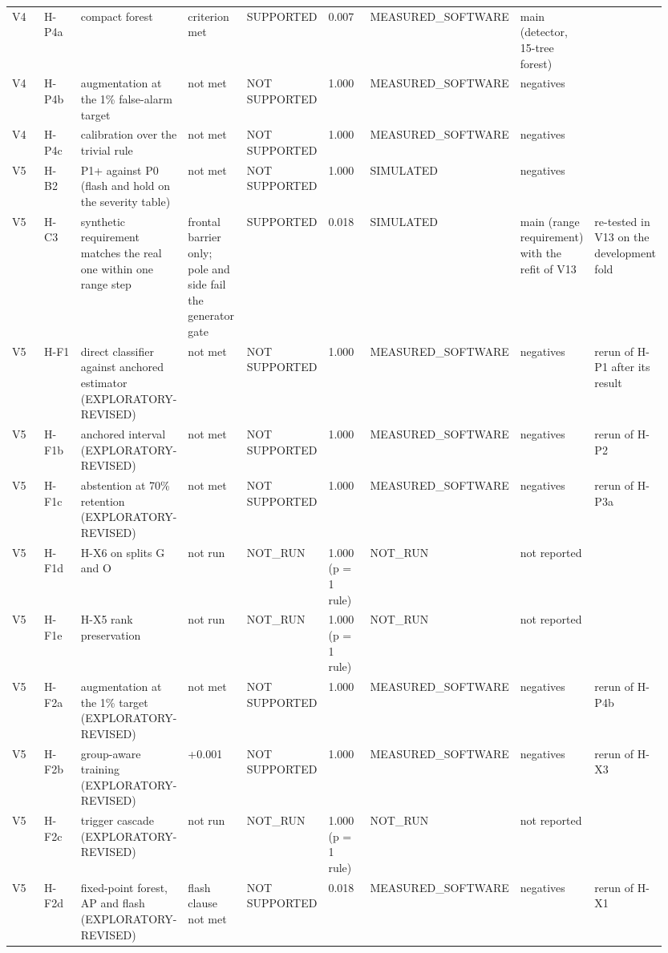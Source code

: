 {\begin{longtable}{p{0.106\linewidth}p{0.106\linewidth}p{0.106\linewidth}p{0.106\linewidth}p{0.106\linewidth}p{0.106\linewidth}p{0.106\linewidth}p{0.106\linewidth}p{0.106\linewidth}}
V4 & H-P4a & compact forest & criterion met & SUPPORTED & 0.007 & MEASURED\_SOFTWARE & main (detector, 15-tree forest) &  \\
V4 & H-P4b & augmentation at the 1\% false-alarm target & not met & NOT SUPPORTED & 1.000 & MEASURED\_SOFTWARE & negatives &  \\
V4 & H-P4c & calibration over the trivial rule & not met & NOT SUPPORTED & 1.000 & MEASURED\_SOFTWARE & negatives &  \\
V5 & H-B2 & P1+ against P0 (flash and hold on the severity table) & not met & NOT SUPPORTED & 1.000 & SIMULATED & negatives &  \\
V5 & H-C3 & synthetic requirement matches the real one within one range step & frontal barrier only; pole and side fail the generator gate & SUPPORTED & 0.018 & SIMULATED & main (range requirement) with the refit of V13 & re-tested in V13 on the development fold \\
V5 & H-F1 & direct classifier against anchored estimator (EXPLORATORY-REVISED) & not met & NOT SUPPORTED & 1.000 & MEASURED\_SOFTWARE & negatives & rerun of H-P1 after its result \\
V5 & H-F1b & anchored interval (EXPLORATORY-REVISED) & not met & NOT SUPPORTED & 1.000 & MEASURED\_SOFTWARE & negatives & rerun of H-P2 \\
V5 & H-F1c & abstention at 70\% retention (EXPLORATORY-REVISED) & not met & NOT SUPPORTED & 1.000 & MEASURED\_SOFTWARE & negatives & rerun of H-P3a \\
V5 & H-F1d & H-X6 on splits G and O & not run & NOT\_RUN & 1.000 (p = 1 rule) & NOT\_RUN & not reported &  \\
V5 & H-F1e & H-X5 rank preservation & not run & NOT\_RUN & 1.000 (p = 1 rule) & NOT\_RUN & not reported &  \\
V5 & H-F2a & augmentation at the 1\% target (EXPLORATORY-REVISED) & not met & NOT SUPPORTED & 1.000 & MEASURED\_SOFTWARE & negatives & rerun of H-P4b \\
V5 & H-F2b & group-aware training (EXPLORATORY-REVISED) & +0.001 & NOT SUPPORTED & 1.000 & MEASURED\_SOFTWARE & negatives & rerun of H-X3 \\
V5 & H-F2c & trigger cascade (EXPLORATORY-REVISED) & not run & NOT\_RUN & 1.000 (p = 1 rule) & NOT\_RUN & not reported &  \\
V5 & H-F2d & fixed-point forest, AP and flash (EXPLORATORY-REVISED) & flash clause not met & NOT SUPPORTED & 0.018 & MEASURED\_SOFTWARE & negatives & rerun of H-X1 \\

\end{longtable}}
